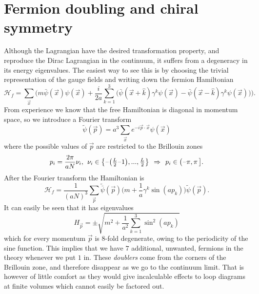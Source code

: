 \section{Fermion doubling and chiral symmetry} \label{sec:fermion_doubling}

Although the Lagrangian  have the desired
transformation property, and reproduce the Dirac Lagrangian in the continuum, it
suffers from a degeneracy in its energy eigenvalues. The easiest way to see this
is by choosing the trivial representation of the gauge fields and writing down
the fermion Hamiltonian
%
\begin{equation}
  \mathcal{H}_f = \sum_{\vec{x}} \bigg(
    m \bar{\psi}(\vec{x}) \psi(\vec{x}) + \frac{i}{2a} \sum_{k=1}^3 \Big(
      \bar{\psi}(\vec{x}+\hat{k})\gamma^k\psi(\vec{x}) 
      -\bar{\psi}(\vec{x}-\hat{k})\gamma^k\psi(\vec{x})\Big)\bigg).
\end{equation}
%
From experience we know that the free Hamiltonian is diagonal in momentum space,
so we introduce a Fourier transform
%
\begin{equation}
  \tilde{\psi}(\vec{p}) = a^3 \sum_{\vec{x}} e^{-i \vec{p}\cdot \vec{x}}
    \psi(\vec{x})
\end{equation}
%
where the possible values of $\vec{p}$ are restricted to the Brillouin zones
%
\begin{equation}
  p_i = \frac{2\pi}{a N} \nu_i, \hskip1ex \nu_i \in
    \big\{\textstyle\minus{}\big(\frac{L}{2}\minus{}1\big), ...,
    \frac{L}{2} \big\} \hskip1ex\Rightarrow\hskip1ex p_i \in \big(\minus\pi, \pi\,\big].
\end{equation}
%
After the Fourier transform the Hamiltonian is
%
\begin{equation}
  \mathcal{H}_f = \frac{1}{(aN)^3}\sum_{\vec{p}} \tilde{\bar{\psi}}(\vec{p})
    \Big( m + \frac{1}{a} \gamma^k \sin (a p_k) \Big) \tilde{\psi}(\vec{p}).
\end{equation}
%
It can easily be seen that it has eigenvalues
%
\begin{equation}
  H_{\vec{p}} = \pm \sqrt{m^2 + \frac{1}{a^2} \sum_{k=1}^3 \sin^2 (a p_k)}
\end{equation}
%
which for every momentum $\vec{p}$ is $8$-fold degenerate, owing to the
periodicity of the sine function. This implies that we have $7$ additional,
unwanted, fermions in the theory whenever we put $1$ in. These \emph{doublers}
come from the corners of the Brillouin zone, and therefore disappear as we go
to the continuum limit. That is however of little comfort as they would give
incalculable effects to loop diagrams at finite volumes which cannot easily be
factored out.

